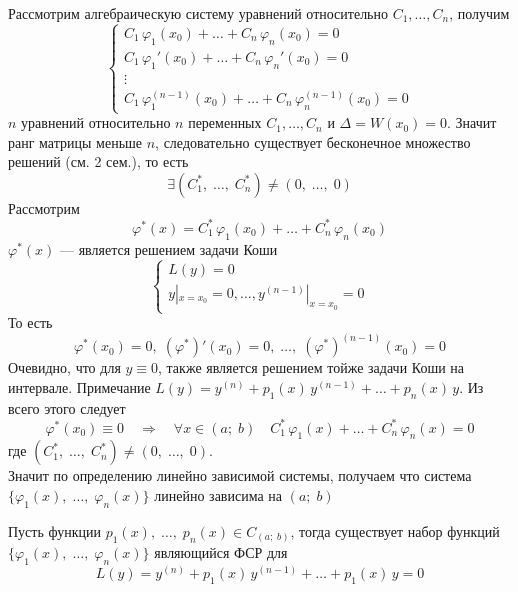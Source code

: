\begin{Proof}
    Рассмотрим алгебраическую систему уравнений относительно $C_1, \dots, C_n$, получим
    \[
        \begin{cases}   
            C_1\,\varphi_1(x_0) + \dots + C_n\,\varphi_n(x_0) = 0\\
            C_1\,\varphi_1'(x_0) + \dots + C_n\,\varphi_n'(x_0) = 0\\
            \vdots\\
            C_1\,\varphi_1^{(n - 1)}(x_0) + \dots + C_n\,\varphi_n^{(n - 1)}(x_0) = 0
        \end{cases}
    \]
    $n$ уравнений относительно $n$ переменных $C_1,\dots,C_n$ и $\Delta = W(x_0) = 0$. Значит ранг матрицы меньше $n$, следовательно существует бесконечное множество решений (см. 2 сем.), то есть
    \[
        \exists (C_1^*,\; \dots,\; C_n^*) \neq (0,\; \dots,\; 0)
    \]
    Рассмотрим
    \[
       \varphi^*(x) = C_1^*\,\varphi_1(x_0) + \dots + C_n^*\,\varphi_n(x_0)
    \]
    $\varphi^*(x)$ --- является решением задачи Коши
    \[
        \begin{cases}
            L(y) = 0\\
            y|_{x=x_0}=0, \dots , y^{(n-1)}|_{x=x_0}=0
        \end{cases}
    \]
    То есть
    \[
        \varphi^*(x_0) = 0,\; (\varphi^*)'(x_0) = 0,\; \dots,\; (\varphi^*)^{(n-1)}(x_0) = 0
    \]
    Очевидно, что для $y \equiv 0$, также является решением тойже задачи Коши на интервале. Примечание $ L(y) = y^{(n)}+p_1(x)\,y^{(n-1)}+\dots+p_n(x)\,y$. Из всего этого следует
    \[
        \varphi^*(x_0) \equiv 0 \quad \Rightarrow \quad \forall x \in (a;\;b) \quad C_1^*\,\varphi_1(x) + \dots + C_n^*\,\varphi_n(x) = 0
    \]
    где $(C_1^*,\; \dots,\; C_n^*) \neq (0,\; \dots,\; 0)$.\\
    Значит по определению линейно зависимой системы, получаем что система $\{\varphi_1(x),\; \dots,\; \varphi_n(x)\}$ линейно зависима на $(a;\;b)$
\end{Proof}

\begin{Th}
    Пусть функции $p_1(x),\; \dots,\; p_n(x) \in C_{(a;\;b)}$, тогда существует набор функций $\{\varphi_1(x),\; \dots,\; \varphi_n(x)\}$ являющийся ФСР для
    \[
        L(y) = y^{(n)} + p_1(x)\,y^{(n - 1)} + \dots + p_1(x)\,y = 0
    \]
\end{Th}

